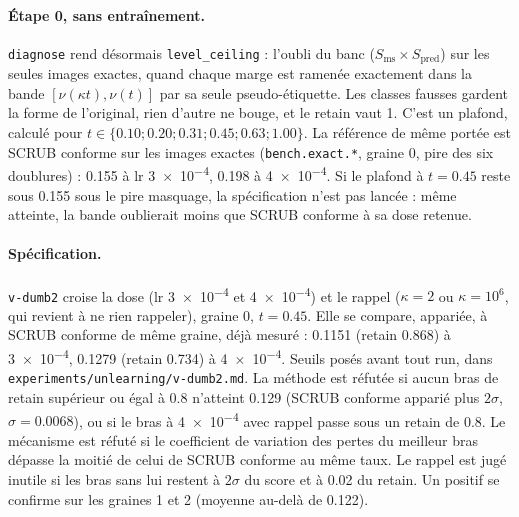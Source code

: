 \documentclass[11pt,a4paper]{article}
\newcommand{\code}[1]{\texttt{#1}}
\newcommand{\chemin}[1]{\nolinkurl{#1}}%
\begin{document}
\paragraph{Étape 0, sans entraînement.} \code{diagnose} rend désormais \code{level\_ceiling} :
l'oubli du banc ($S_{\text{ms}}\times S_{\text{pred}}$) sur les seules images exactes, quand chaque
marge est ramenée exactement dans la bande $[\nu(\kappa t),\nu(t)]$ par sa seule pseudo-étiquette. Les
classes fausses gardent la forme de l'original, rien d'autre ne bouge, et le retain vaut 1. C'est un
plafond, calculé pour $t\in\{\num{0.10};\num{0.20};\num{0.31};\num{0.45};\num{0.63};\num{1.00}\}$. La
référence de même portée est SCRUB conforme sur les images exactes (\code{bench.exact.*}, graine 0, pire
des six doublures) : \num{0.155} à lr \num{3e-4}, \num{0.198} à \num{4e-4}. Si le plafond à $t=\num{0.45}$
reste sous \num{0.155} sous le pire masquage, la spécification n'est pas lancée : même atteinte, la
bande oublierait moins que SCRUB conforme à sa dose retenue.

\paragraph{Spécification.} \code{v-dumb2} croise la dose (lr \num{3e-4} et \num{4e-4}) et le rappel
($\kappa=2$ ou $\kappa=10^6$, qui revient à ne rien rappeler), graine 0, $t=\num{0.45}$. Elle se compare,
appariée, à SCRUB conforme de même graine, déjà mesuré : \num{0.1151} (retain \num{0.868}) à
\num{3e-4}, \num{0.1279} (retain \num{0.734}) à \num{4e-4}. Seuils posés avant tout run, dans
\chemin{experiments/unlearning/v-dumb2.md}. La méthode est réfutée si aucun bras de retain supérieur ou
égal à \num{0.8} n'atteint \num{0.129} (SCRUB conforme apparié plus $2\sigma$, $\sigma=\num{0.0068}$), ou
si le bras à \num{4e-4} avec rappel passe sous un retain de \num{0.8}. Le mécanisme est réfuté si le
coefficient de variation des pertes du meilleur bras dépasse la moitié de celui de SCRUB conforme au
même taux. Le rappel est jugé inutile si les bras sans lui restent à $2\sigma$ du score et à \num{0.02}
du retain. Un positif se confirme sur les graines 1 et 2 (moyenne au-delà de \num{0.122}).
\end{document}
